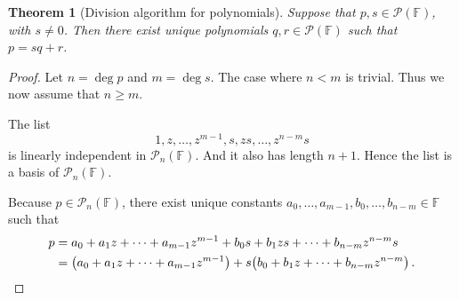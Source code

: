 \documentclass[nofonts,colorlinks]{tufte-handout}
\theoremstyle{plain} %
\newtheorem{thm}{Theorem}
\theoremstyle{definition}
\theoremstyle{remark}
\def\idea{\textit{\color[rgb]{0,0,.55}Proof Idea. }}
\newcommand{\bra}[1]{\mathopen{}\left(#1\right)}
\newcommand{\abs}[1]{\mathopen{}\left|#1\right|}
\newcommand{\C}{\mathbb{C}}
\newcommand{\F}{\mathbb{F}}
\renewcommand{\P}{\mathcal{P}}
\begin{document}
\begin{thm}[Division algorithm for polynomials]
	Suppose that $p,s\in\P(\F)$, with $s\neq0$. Then there exist unique polynomials $q,r\in\P(\F)$ such that $p=sq+r$.%
\end{thm}
\begin{proof}
	Let $n=\deg p$ and $m=\deg s$. The case where $n<m$ is trivial. Thus we now assume that $n\geq m$.

	The list
	\[1,z,\dots,z^{m-1},s,zs,\dots,z^{n-m}s\]
	is linearly independent in $\P_n(\F)$. And it also has length $n+1$. Hence the list is a basis of $\P_n(\F)$.

	Because $p\in\P_n(\F)$, there exist unique constants $a_0,\dots,a_{m-1},b_0,\dots,b_{n-m}\in\F$ such that
	\begin{align*}
		p&=a_0+a_1z+\cdots+a_{m-1}z^{m-1}+b_0s+b_1zs+\cdots+b_{n-m}z^{n-m}s\\
		&=\bra{a_0+a_1z+\cdots+a_{m-1}z^{m-1}}+s\bra{b_0+b_1z+\cdots+b_{n-m}z^{n-m}}.\qedhere
	\end{align*}
\end{proof}


	
\end{document}
